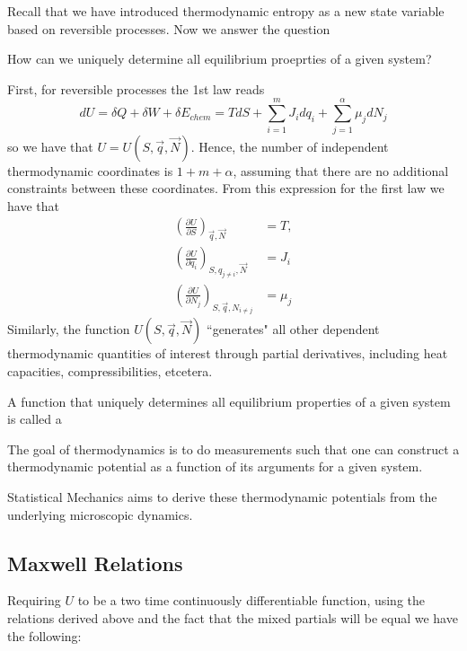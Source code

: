 \documentclass[12pt, a4paper, oneside, openright, titlepage]{book}
\begin{document}
Recall that we have introduced thermodynamic entropy as a new state variable based on reversible processes. Now we answer the question 
\begin{qst}
    How can we uniquely determine all equilibrium proeprties of a given system?
\end{qst}
First, for reversible processes the 1st law reads \begin{equation*}
    dU = \delta Q + \delta W + \delta E_{chem} = TdS + \sum_{i=1}^mJ_idq_i + \sum_{j=1}^{\alpha}\mu_jdN_j
\end{equation*}
so we have that $U = U(S,\vec{q},\vec{N})$. Hence, the number of independent thermodynamic coordinates is $1+m+\alpha$, assuming that there are no additional constraints between these coordinates. From this expression for the first law we have that \begin{align*}
    \left(\frac{\partial U}{\partial S}\right)_{\vec{q},\vec{N}} &= T, \\
    \left(\frac{\partial U}{\partial q_i}\right)_{S,q_{j\neq i},\vec{N}} &= J_i \\
    \left(\frac{\partial U}{\partial N_j}\right)_{S,\vec{q},N_{i\neq j}} &= \mu_j
\end{align*}
Similarly, the function $U(S,\vec{q},\vec{N})$ ``generates" all other dependent thermodynamic quantities of interest through partial derivatives, including heat capacities, compressibilities, etcetera.

\begin{defn}
    A function that uniquely determines all equilibrium properties of a given system is called a 
\end{defn}

\begin{rmk}
    The goal of thermodynamics is to do measurements such that one can construct a thermodynamic potential as a function of its arguments for a given system.
\end{rmk}

Statistical Mechanics aims to derive these thermodynamic potentials from the underlying microscopic dynamics.

\subsection{Maxwell Relations}

Requiring $U$ to be a two time continuously differentiable function, using the relations derived above and the fact that the mixed partials will be equal we have the following:
\end{document}
